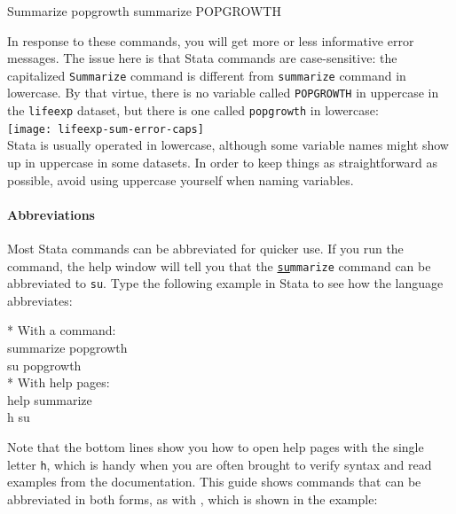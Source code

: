     \begin{docspec}
      Summarize popgrowth
      summarize POPGROWTH
    \end{docspec}

    In response to these commands, you will get more or less informative error messages. The issue here is that Stata commands are case-sensitive: the capitalized \texttt{Summarize} command is different from \texttt{summarize} command in lowercase. By that virtue, there is no variable called \texttt{POPGROWTH} in uppercase in the \texttt{lifeexp} dataset, but there is one called \texttt{popgrowth} in lowercase:\\[1em]%

    \texttt{[image: lifeexp-sum-error-caps]}\\[1em]
    
    Stata is usually operated in lowercase, although some variable names might show up in uppercase in some datasets. In order to keep things as straightforward as possible, avoid using uppercase yourself when naming variables.%
    
    \paragraph{Abbreviations}%

    Most Stata commands can be abbreviated for quicker use. If you run the  command, the help window will tell you that the \texttt{\underline{su}mmarize} command can be abbreviated to \texttt{su}. Type the following example in Stata to see how the language abbreviates:%
    
    \begin{docspec}
      * With a command:\\%
      summarize popgrowth\\%
      su popgrowth\\[1em]%
      * With help pages:\\%
      help summarize\\%
      h su%
    \end{docspec}%

  Note that the bottom lines show you how to open help pages with the single letter \texttt{h}, which is handy when you are often brought to verify syntax and read examples from the documentation. This guide shows commands that can be abbreviated in both forms, as with , which is shown in the example:\\[1em]%

